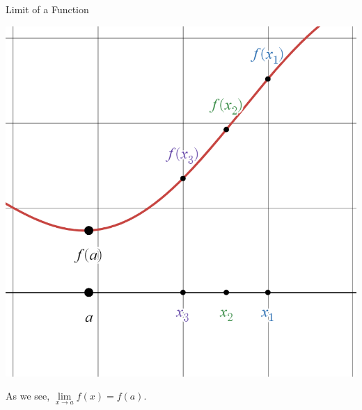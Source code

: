 \documentclass{beamer}
\begin{document}
\begin{frame}{Limit of a Function}

      \begin{center}

    \includegraphics[height=0.75\textheight, keepaspectratio]{cont3.png}
  \end{center}

{\color{white} As we see, $\lim\limits_{x\to a} f(x) = f(a)$.}

\end{frame}
\end{document}
